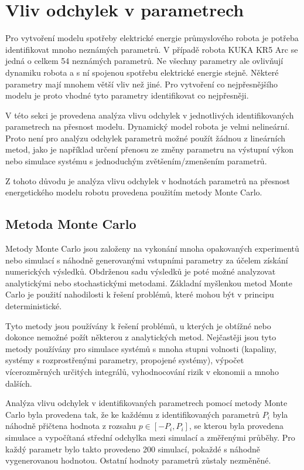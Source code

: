 \chapter{Vliv odchylek v parametrech}

Pro vytvoření modelu spotřeby elektrické energie průmyslového robota je potřeba identifikovat mnoho neznámých parametrů. V případě robota KUKA KR5 Arc se jedná o celkem 54 neznámých parametrů. Ne všechny parametry ale ovlivňují dynamiku robota a s ní spojenou spotřebu elektrické energie stejně. Některé parametry mají mnohem větší vliv než jiné. Pro vytvoření co nejpřesnějšího modelu je proto vhodné tyto parametry identifikovat co nejpřesněji. 

V této sekci je provedena analýza vlivu odchylek v jednotlivých identifikovaných parametrech na přesnost modelu. Dynamický model robota je velmi nelineární. Proto není pro analýzu odchylek parametrů možné použít žádnou z lineárních metod, jako je například určení přenosu ze změny parametru na výstupní výkon nebo simulace systému s jednoduchým zvětšením/zmenšením parametrů. 

Z tohoto důvodu je analýza vlivu odchylek v hodnotách parametrů na přesnost energetického modelu robotu provedena použitím metody Monte Carlo. 

\section{Metoda Monte Carlo}

Metody Monte Carlo jsou založeny na vykonání mnoha opakovaných experimentů nebo simulací s náhodně generovanými vstupními parametry za účelem získání numerických výsledků. Obdrženou sadu výsledků je poté možné analyzovat analytickými nebo stochastickými metodami. Základní myšlenkou metod Monte Carlo je použití nahodilosti k řešení problémů, které mohou být v principu deterministické.

Tyto metody jsou používány k řešení problémů, u kterých je obtížné nebo dokonce nemožné požít některou z analytických metod. Nejčastěji jsou tyto metody používány pro simulace systémů s mnoha stupni volnosti (kapaliny, systémy s rozprostřenými parametry, propojené systémy), výpočet vícerozměrných určitých integrálů, vyhodnocování rizik v ekonomii a mnoho dalších. 

Analýza vlivu odchylek v identifikovaných parametrech pomocí metody Monte Carlo byla provedena tak, že ke každému z identifikovaných parametrů $P_i$ byla náhodně přičtena hodnota z rozsahu $p \in [-P_i,P_i]$, se kterou byla provedena simulace a vypočítaná střední odchylka mezi simulací a změřenými průběhy. Pro každý parametr bylo takto provedeno 200 simulací, pokaždé s náhodně vygenerovanou hodnotou. Ostatní hodnoty parametrů zůstaly nezměněné. 

